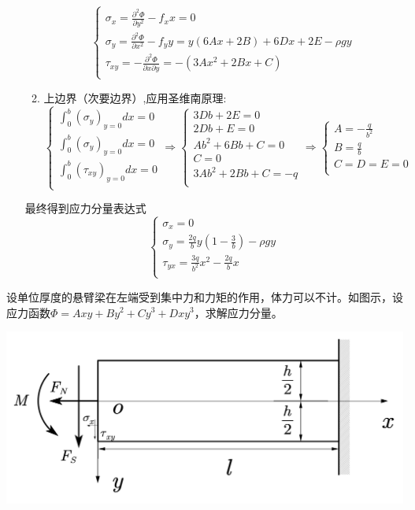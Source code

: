 \begin{remark}
\begin{enumerate}
\begin{enumerate}
\[\begin{cases}
			\sigma _x=\frac{\partial ^2\varPhi}{\partial y^2}-f_xx=0\\
			\sigma _y=\frac{\partial ^2\varPhi}{\partial x^2}-f_yy=y\left( 6Ax+2B \right) +6Dx+2E-\rho gy\\
			\tau _{xy}=-\frac{\partial ^2\varPhi}{\partial x\partial y}=-\left( 3Ax^2+2Bx+C \right)\\
			\end{cases}\]
			\item 上边界（次要边界）,应用圣维南原理:
			\[\begin{cases}
			\int_0^b{\left( \sigma _y \right) _{y=0}dx=0}\\
			\int_0^b{\left( \sigma _y \right) _{y=0}dx}=0\\
			\int_0^b{\left( \tau _{xy} \right) _{y=0}dx}=0\\
			\end{cases}\Longrightarrow \begin{cases}
			3Db+2E=0\\
			2Db+E=0\\
			Ab^2+6Bb+C=0\\
			C=0\\
			3Ab^2+2Bb+C=-q\\
			\end{cases}\Longrightarrow \begin{cases}
			A=-\frac{q}{b^2}\\
			B=\frac{q}{b}\\
			C=D=E=0\\
			\end{cases}\]
		\end{enumerate}
	最终得到应力分量表达式\[\begin{cases}
	\sigma _x=0\\
	\sigma _y=\frac{2q}{b}y\left( 1-\frac{3}{b} \right) -\rho gy\\
	\tau _{yx}=\frac{3q}{b^2}x^2-\frac{2q}{b}x\\
	\end{cases}\]
	\end{enumerate}
\end{remark}
\begin{example}
设单位厚度的悬臂梁在左端受到集中力和力矩的作用，体力可以不计。如图示，设应力函数$\varPhi =Axy+By^2+Cy^3+Dxy^3$，求解应力分量。
\end{example}
\centerline{\includegraphics[scale=0.6]{figure/3-6.png}}
